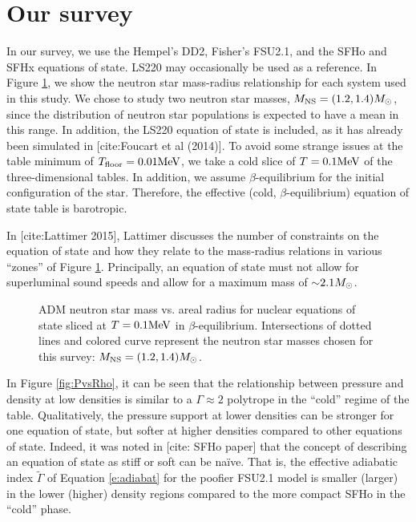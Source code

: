 \section{Our survey}

In our survey, we use the Hempel's DD2, Fisher's FSU2.1, and the SFHo and SFHx equations of state.  LS220 may occasionally be used as a reference. 
In Figure \ref{fig:MvsR}, we show the neutron star mass-radius relationship for each system used in this study.  We chose to study two neutron star masses, $M_{\rm NS} = (1.2, 1.4) M_{\odot}$, since the distribution of neutron star populations is expected to have a mean in this range. In addition, the LS220 equation of state is included, as it has already been simulated in [cite:Foucart et al (2014)].  To avoid some strange issues at the table minimum of $T_{\rm floor} = 0.01 {\rm MeV}$, we take a cold slice of  $T = 0.1 {\rm MeV}$ of the three-dimensional tables.  In addition, we assume $\beta$-equilibrium for the initial configuration of the star.  Therefore, the effective (cold, $\beta$-equilibrium) equation of state table is barotropic. 

In [cite:Lattimer 2015], Lattimer discusses the number of constraints on the equation of state and how they relate to the mass-radius relations in various ``zones'' of Figure \ref{fig:MvsR}.  Principally, an equation of state must not allow for superluminal sound speeds and allow for a maximum mass of $\mathord{\sim} 2.1 M_{\odot}$.

\begin{figure}
	\centering
	
	\caption[Neutron star mass vs. areal radius]{
		ADM neutron star mass vs. areal radius for nuclear equations of state sliced at $T=0.1{\rm MeV}$ in $\beta$-equilibrium.  Intersections of dotted lines and colored curve represent the neutron star masses chosen for this survey: $M_{\rm NS} = (1.2, 1.4) M_{\odot}$.  
	}
	\label{fig:MvsR}
\end{figure}

In Figure \ref{fig:PvsRho}, it can be seen that the relationship between pressure and density at low densities is similar to a $\Gamma \approx 2$ polytrope in the ``cold'' regime of the table.  Qualitatively, the pressure support at lower densities can be stronger for one equation of state, but softer at higher densities compared to other equations of state.  Indeed, it was noted in [cite: SFHo paper] that the concept of describing an equation of state as stiff or soft can be na\"{i}ve.  That is, the effective adiabatic index $\tilde{\Gamma}$ of Equation \ref{e:adiabat} for the poofier FSU2.1 model is smaller (larger) in the lower (higher) density regions compared to the more compact SFHo in the ``cold'' phase.

